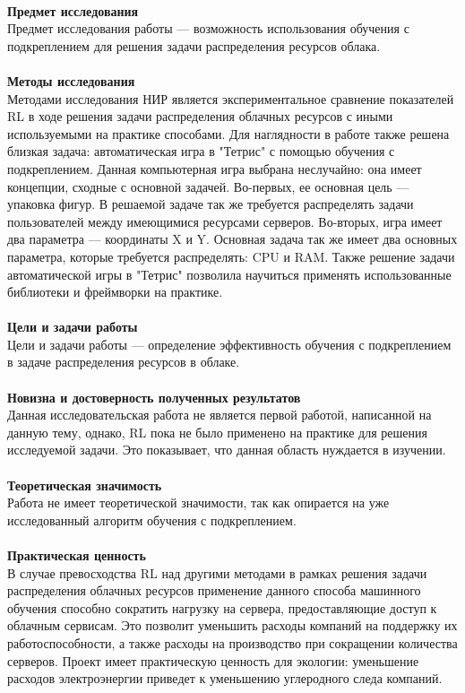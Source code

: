\documentclass{article}
\begin{document}
~\\
\textbf{Предмет исследования}\\
Предмет исследования работы — возможность использования обучения с подкреплением для решения задачи распределения ресурсов облака.\\
~\\
\textbf{Методы исследования}\\
Методами исследования НИР является экспериментальное сравнение показателей RL в ходе решения задачи распределения облачных ресурсов с иными используемыми на практике способами. Для наглядности в работе также решена близкая задача: автоматическая игра в "Тетрис" с помощью обучения с подкреплением.  Данная компьютерная игра выбрана неслучайно: она имеет концепции, сходные с основной задачей. Во-первых, ее основная цель — упаковка фигур. В решаемой задаче так же требуется распределять задачи пользователей между имеющимися ресурсами серверов. Во-вторых, игра имеет два параметра — координаты X и Y. Основная задача так же имеет два основных параметра, которые требуется распределять: CPU и RAM. Также решение задачи автоматической игры в "Тетрис" позволила научиться применять использованные библиотеки и фреймворки на практике.\\
~\\
\textbf{Цели и задачи работы}\\
Цели и задачи работы — определение эффективность обучения с подкреплением в задаче распределения ресурсов в облаке.\\
~\\
\textbf{Новизна и достоверность полученных результатов}\\
Данная исследовательская работа не является первой работой, написанной на данную тему, однако, RL пока не было применено на практике для решения исследуемой задачи. Это показывает, что данная область нуждается в изучении.\\
~\\
\textbf{Теоретическая значимость}\\
Работа не имеет теоретической значимости, так как опирается на уже исследованный алгоритм обучения с подкреплением.\\
~\\
\textbf{Практическая ценность}\\
В случае превосходства RL над другими методами в рамках решения задачи распределения облачных ресурсов применение данного способа машинного обучения способно сократить нагрузку на сервера, предоставляющие доступ к облачным сервисам. Это позволит уменьшить расходы компаний на поддержку их работоспособности, а также расходы на производство при сокращении количества серверов. Проект имеет практическую ценность для экологии: уменьшение расходов электроэнергии приведет к уменьшению углеродного следа компаний.\\
\end{document}
